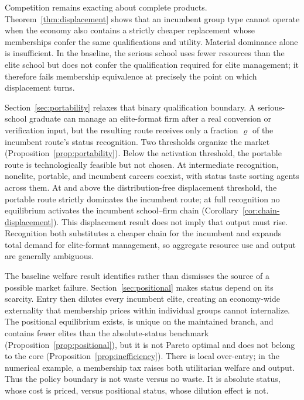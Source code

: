 \documentclass[12pt,letterpaper]{article}
\theoremstyle{definition}
\begin{document}
Competition remains exacting about complete products.
Theorem~\ref{thm:displacement} shows that an incumbent group type cannot operate when the
economy also contains a strictly cheaper replacement whose memberships confer the same
qualifications and utility.
Material dominance alone is insufficient.
In the baseline, the serious school uses fewer resources than the elite school but does not
confer the qualification required for elite management; it therefore fails membership
equivalence at precisely the point on which displacement turns.

Section~\ref{sec:portability} relaxes that binary qualification boundary.
A serious-school graduate can manage an elite-format firm after a real conversion or
verification input, but the resulting route receives only a fraction $\varrho$ of the
incumbent route's status recognition.
Two thresholds organize the market (Proposition~\ref{prop:portability}).
Below the activation threshold, the portable route is technologically feasible but not
chosen.
At intermediate recognition, nonelite, portable, and incumbent careers coexist, with
status taste sorting agents across them.
At and above the distribution-free displacement threshold, the portable route strictly
dominates the incumbent route; at full recognition no equilibrium activates the incumbent
school--firm chain (Corollary~\ref{cor:chain-displacement}).
This displacement result does not imply that output must rise.
Recognition both substitutes a cheaper chain for the incumbent and expands total demand
for elite-format management, so aggregate resource use and output are generally
ambiguous.

The baseline welfare result identifies rather than dismisses the source of a possible
market failure.
Section~\ref{sec:positional} makes status depend on its scarcity.
Entry then dilutes every incumbent elite, creating an economy-wide externality that
membership prices within individual groups cannot internalize.
The positional equilibrium exists, is unique on the maintained branch, and contains fewer
elites than the absolute-status benchmark (Proposition~\ref{prop:positional}), but it is
not Pareto optimal and does not belong to the core
(Proposition~\ref{prop:inefficiency}).
There is local over-entry; in the numerical example, a membership tax raises both
utilitarian welfare and output.
Thus the policy boundary is not waste versus no waste.
It is absolute status, whose cost is priced, versus positional status, whose dilution
effect is not.
\end{document}
